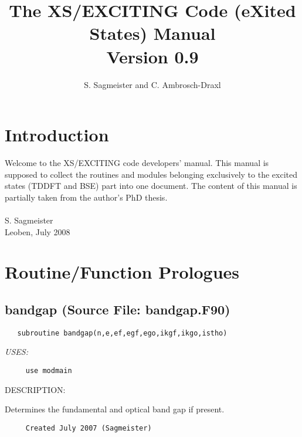 \documentclass[11pt]{article}
\title{The XS/EXCITING Code (eXited States) Manual \\ Version 0.9}
\author{{\sc S. Sagmeister and C. Ambrosch-Draxl}\\ {\em }}
\date{}
\begin{document}
\maketitle
\tableofcontents
\newpage
 
\section{Introduction}

     Welcome to the {\sf XS/EXCITING} code developers' manual.
     This manual is supposed to collect the routines and modules belonging
     exclusively to the excited states (TDDFT and BSE) part into one document.
     The content of this manual is partially taken from the author's PhD thesis.
     \\\\
     S. Sagmeister\\
     Leoben, July 2008
   
\newpage


 
\section{Routine/Function Prologues} \label{app:ProLogues}
\subsection{bandgap (Source File: bandgap.F90)}


\begin{verbatim}   subroutine bandgap(n,e,ef,egf,ego,ikgf,ikgo,istho)\end{verbatim}{\em USES:}
\begin{verbatim}     use modmain\end{verbatim}
{\sf DESCRIPTION:\\ }


     Determines the fundamental and optical band gap if present.
  
\begin{verbatim}     Created July 2007 (Sagmeister)\end{verbatim}

\end{document}
